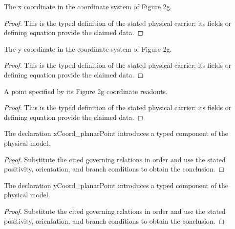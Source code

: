 \begin{definition}
  \label{def:physics:IPhO_2026_2_C_3:aux002}
  The x coordinate in the coordinate system of Figure 2g.
\end{definition}
\begin{proof}
  This is the typed definition of the stated physical carrier; its fields or defining equation provide the claimed data.
\end{proof}

\begin{definition}
  \label{def:physics:IPhO_2026_2_C_3:aux003}
  The y coordinate in the coordinate system of Figure 2g.
\end{definition}
\begin{proof}
  This is the typed definition of the stated physical carrier; its fields or defining equation provide the claimed data.
\end{proof}

\begin{definition}
  \label{def:physics:IPhO_2026_2_C_3:aux004}
  A point specified by its Figure 2g coordinate readouts.
\end{definition}
\begin{proof}
  This is the typed definition of the stated physical carrier; its fields or defining equation provide the claimed data.
\end{proof}

\begin{lemma}
  \label{lem:physics:IPhO_2026_2_C_3:aux005}
  The declaration xCoord\_planarPoint introduces a typed component of the physical model.
\end{lemma}
\begin{proof}
  Substitute the cited governing relations in order and use the stated positivity, orientation, and branch conditions to obtain the conclusion.
\end{proof}

\begin{lemma}
  \label{lem:physics:IPhO_2026_2_C_3:aux006}
  The declaration yCoord\_planarPoint introduces a typed component of the physical model.
\end{lemma}
\begin{proof}
  Substitute the cited governing relations in order and use the stated positivity, orientation, and branch conditions to obtain the conclusion.
\end{proof}

